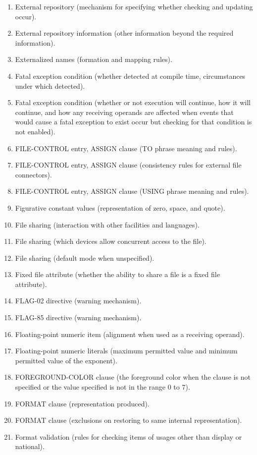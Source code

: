 \begin{enumerate}
\item External repository (mechanism for specifying whether checking and updating occur).
\item External repository information (other information beyond the required information).
\item Externalized names (formation and mapping rules).
\item Fatal exception condition (whether detected at compile time, circumstances under which detected).
\item Fatal exception condition (whether or not execution will continue, how it will continue, and how any receiving operands are affected when events that would cause a fatal exception to exist occur but checking for that condition is not enabled).
\item FILE-CONTROL entry, ASSIGN clause (TO phrase meaning and rules).
\item FILE-CONTROL entry, ASSIGN clause (consistency rules for external file connectors).
\item FILE-CONTROL entry, ASSIGN clause (USING phrase meaning and rules).
\item Figurative constant values (representation of zero, space, and quote).
\item File sharing (interaction with other facilities and languages).
\item File sharing (which devices allow concurrent access to the file).
\item File sharing (default mode when unspecified).
\item Fixed file attribute (whether the ability to share a file is a fixed file attribute).
\item FLAG-02 directive (warning mechanism).
\item FLAG-85 directive (warning mechanism).
\item Floating-point numeric item (alignment when used as a receiving operand).
\item Floating-point numeric literals (maximum permitted value and minimum permitted value of the exponent).
\item FOREGROUND-COLOR clause (the foreground color when the clause is not specified or the value specified is
  not in the range 0 to 7).
\item FORMAT clause (representation produced).
\item FORMAT clause (exclusions on restoring to same internal representation).
\item Format validation (rules for checking items of usages other than display or national).

\end{enumerate}
